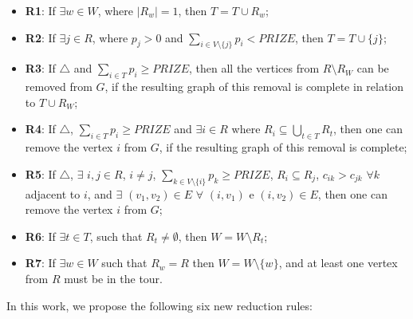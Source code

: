 \documentclass{singlecol-new}
\theoremstyle{TH}{
\newtheorem{lemma}{Lemma}
\newtheorem{theorem}[lemma]{Theorem}
\newtheorem{corrolary}[lemma]{Corrolary}
\newtheorem{conjecture}[lemma]{Conjecture}
\newtheorem{proposition}[lemma]{Proposition}
\newtheorem{claim}[lemma]{Claim}
\newtheorem{stheorem}[lemma]{Wrong Theorem}
}
\theoremstyle{THrm}{
\newtheorem{definition}{Definition}[section]
\newtheorem{question}{Question}[section]
\newtheorem{remark}{Remark}
\newtheorem{scheme}{Scheme}
}
\theoremstyle{THhit}{
\newtheorem{case}{Case}[section]
}
\begin{document}
 \begin{itemize}
	\item \textbf{R1}: If $\exists w \in W$, where $|R_w| = 1$, then $T = T \cup R_w$;
	
	\item \textbf{R2}: If $\exists j \in R$, where $p_j > 0$ and $\sum_{i \in V \setminus \{ j \}} p_i < PRIZE$, then $T = T \cup \{ j \}$;
	
	\item \textbf{R3}: If $\triangle$ and $\sum_{i \in T}p_i \geq PRIZE$, then all the vertices from $R \setminus R_W$ can be removed from $G$, if the resulting graph of this removal is complete in relation to $T \cup R_W$;
	
	\item \textbf{R4}: If $\triangle$, $ \sum_{i \in T}p_i \geq PRIZE$ and $\exists i \in R$ where $R_i \subseteq \bigcup_{t \in T} R_t$, then one can  remove the vertex $i$ from $G$, if the resulting graph of this removal is complete;
	
	
	\item \textbf{R5}: If $\triangle$, $\exists$ $i,j \in R$, $i \neq j$, $ \sum_{k \in V \setminus \{i \}} p_k \geq PRIZE$, $R_i \subseteq R_j$, $c_{ik} > c_{jk}$ $\forall k$ adjacent to $i$, and $\exists$ $(v_1,v_2) \in E$ $\forall$ $(i,v_1)$ e $(i,v_2) \in E$, then one can remove the vertex $i$ from $G$;
	
	
	\item \textbf{R6}: If $\exists t \in T$, such that $R_t \neq \emptyset$, then $W = W \setminus R_t$;
	
	\item \textbf{R7}: If $\exists w \in W$ such that $R_w = R$ then $W = W \setminus \{ w \}$, and at least one vertex from $R$ must be in the tour.
	
\end{itemize}	








 In this work, we propose the following six new reduction rules:


\end{document}
